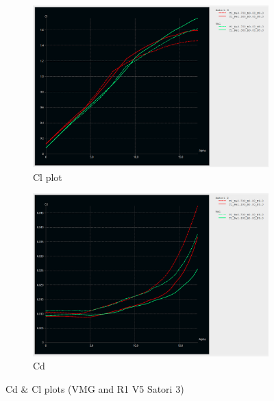 \begin{figure}[H]
\begin{subfigure}{0.5\textwidth}
\includegraphics[width=1\textwidth]{figures/2D steady simulations/xflr5/Cl vmg sat3.png}
\caption{Cl plot}
\label{fig:Cl_plot_of_the_VMG_and_R1_V5_Satori_3}
\end{subfigure}
\begin{subfigure}{0.5\textwidth}
\includegraphics[width=1\textwidth]{figures/2D steady simulations/xflr5/Cd vmg sat3.png}
\caption{Cd}
\label{fig:Cd_plot_of_the_VMG_and_R1_V5_Satori_3}
\end{subfigure}
\caption{Cd $\&$ Cl plots (VMG and R1 V5 Satori 3)}
\label{fig:Cd_Cl_plot_of_the_VMG_and_R1_V5_Satori_3}
\end{figure}

